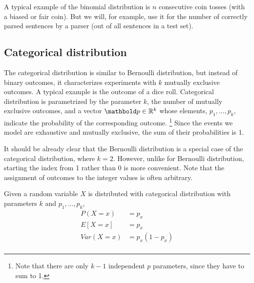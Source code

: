 A typical example of the binomial distribution is
$n$ consecutive coin tosses (with a biased or fair coin).
But we will, for example, use it for
the number of correctly parsed sentences by a parser
(out of all sentences in a test set).

\subsection{Categorical distribution}

The categorical distribution is similar to Bernoulli distribution,
but instead of binary outcomes,
it characterizes experiments with $k$ mutually exclusive outcomes.
A typical example is the outcome of a dice roll. 
Categorical distribution is parametrized by the parameter $k$,
the number of mutually exclusive outcomes,
and a vector $\vect{p} \in \mathbb{R}^{k}$ whose elements,
$p_{1}, \ldots, p_{k}$,
indicate the probability of the corresponding outcome.%
\footnote{Note that there are only $k - 1$ independent $p$ parameters,
since they have to sum to \num{1}.
}
Since the events we model are exhaustive and mutually exclusive,
the sum of their probabilities is \num{1}.

It should be already clear that the Bernoulli distribution is
a special case of the categorical distribution,
where $k = 2$.
However, unlike for Bernoulli distribution,
starting the index from \num{1} rather than \num{0} is more convenient.
Note that the assignment of outcomes to the integer values is often arbitrary.

Given a random variable $X$ is distributed with categorical distribution
with parameters $k$ and $p_{1}, \ldots, p_{k}$,
\[ 
  \begin{aligned} 
    P(X = x) &= p_{x}\\
    E[X=x] &= p_{x} \\
    Var(X = x) &= p_{x} (1 - p_{x}) \\
  \end{aligned}
\]

